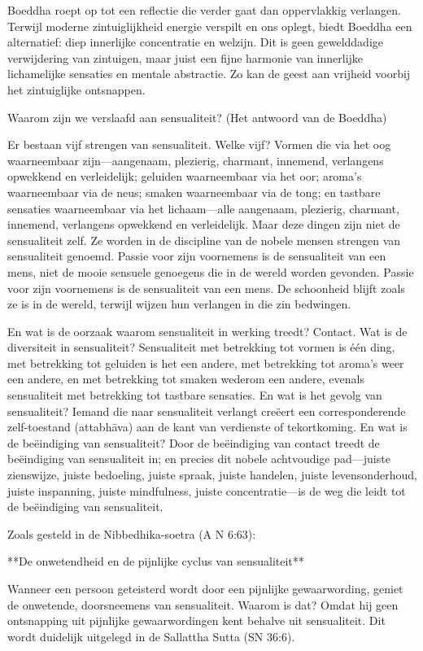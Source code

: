 Boeddha roept op tot een reflectie die verder gaat dan oppervlakkig verlangen. Terwijl moderne zintuiglijkheid energie verspilt en ons oplegt, biedt Boeddha een alternatief: diep innerlijke concentratie en welzijn. Dit is geen gewelddadige verwijdering van zintuigen, maar juist een fijne harmonie van innerlijke lichamelijke sensaties en mentale abstractie. Zo kan de geest aan vrijheid voorbij het zintuiglijke ontsnappen.

Waarom zijn we verslaafd aan sensualiteit? (Het antwoord van de Boeddha)

Er bestaan vijf strengen van sensualiteit. Welke vijf? Vormen die via het oog waarneembaar zijn—aangenaam, plezierig, charmant, innemend, verlangens opwekkend en verleidelijk; geluiden waarneembaar via het oor; aroma’s waarneembaar via de neus; smaken waarneembaar via de tong; en tastbare sensaties waarneembaar via het lichaam—alle aangenaam, plezierig, charmant, innemend, verlangens opwekkend en verleidelijk. Maar deze dingen zijn niet de sensualiteit zelf. Ze worden in de discipline van de nobele mensen strengen van sensualiteit genoemd. Passie voor zijn voornemens is de sensualiteit van een mens, niet de mooie sensuele genoegens die in de wereld worden gevonden. Passie voor zijn voornemens is de sensualiteit van een mens. De schoonheid blijft zoals ze is in de wereld, terwijl wijzen hun verlangen in die zin bedwingen.

En wat is de oorzaak waarom sensualiteit in werking treedt? Contact. Wat is de diversiteit in sensualiteit? Sensualiteit met betrekking tot vormen is één ding, met betrekking tot geluiden is het een andere, met betrekking tot aroma’s weer een andere, en met betrekking tot smaken wederom een andere, evenals sensualiteit met betrekking tot tastbare sensaties. En wat is het gevolg van sensualiteit? Iemand die naar sensualiteit verlangt creëert een corresponderende zelf-toestand (attabhāva) aan de kant van verdienste of tekortkoming. En wat is de beëindiging van sensualiteit? Door de beëindiging van contact treedt de beëindiging van sensualiteit in; en precies dit nobele achtvoudige pad—juiste zienswijze, juiste bedoeling, juiste spraak, juiste handelen, juiste levensonderhoud, juiste inspanning, juiste mindfulness, juiste concentratie—is de weg die leidt tot de beëindiging van sensualiteit.

Zoals gesteld in de Nibbedhika-soetra (A N 6:63):

**De onwetendheid en de pijnlijke cyclus van sensualiteit**

Wanneer een persoon geteisterd wordt door een pijnlijke gewaarwording, geniet de onwetende, doorsneemens van sensualiteit. Waarom is dat? Omdat hij geen ontsnapping uit pijnlijke gewaarwordingen kent behalve uit sensualiteit. Dit wordt duidelijk uitgelegd in de Sallattha Sutta (SN 36:6).

